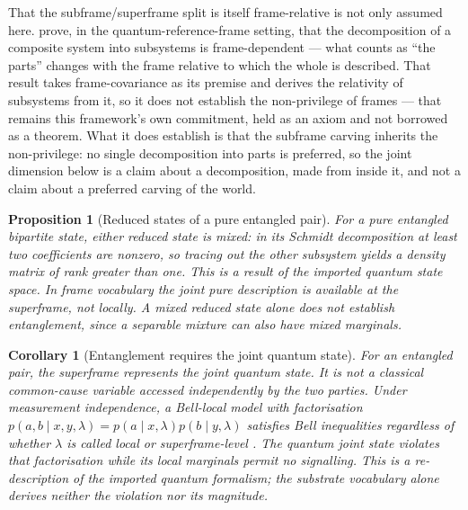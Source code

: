 \documentclass[11pt,a4paper]{article}
\newtheorem{proposition}[definition]{Proposition}
\newtheorem{corollary}[definition]{Corollary}
\theoremstyle{remark}\newtheorem{remark}[definition]{Remark}
\begin{document}
That the subframe/superframe split is itself frame-relative is not only assumed here.
\citet{aliahmad2022} prove, in the quantum-reference-frame setting, that the
decomposition of a composite system into subsystems is frame-dependent --- what counts
as ``the parts'' changes with the frame relative to which the whole is described. That result takes frame-covariance as
its premise and derives the relativity of subsystems from it, so it does not establish the
non-privilege of frames --- that remains this framework's own commitment, held as an axiom and
not borrowed as a theorem. What it does establish is that the subframe carving inherits the
non-privilege: no single decomposition into parts is preferred, so the joint dimension below is
a claim about a decomposition, made from inside it, and not a claim about a preferred
carving of the world.

\begin{proposition}[Reduced states of a pure entangled pair]\label{prop:mixed}
For a pure entangled bipartite state, either reduced state is mixed: in its
Schmidt decomposition at least two coefficients are nonzero, so tracing out
the other subsystem yields a density matrix of rank greater than one. This
is a result of the imported quantum state space. In frame vocabulary the joint
pure description is available at the superframe, not locally. A mixed reduced
state alone does not establish entanglement, since a separable mixture can
also have mixed marginals.
\end{proposition}

\begin{corollary}[Entanglement requires the joint quantum state]\label{cor:nonlocal}
For an entangled pair, the superframe represents the joint quantum state.
It is not a classical common-cause variable accessed independently by the two
parties. Under measurement independence, a Bell-local model with factorisation
$p(a,b\mid x,y,\lambda)=p(a\mid x,\lambda)p(b\mid y,\lambda)$ satisfies
Bell inequalities regardless of whether $\lambda$ is called local or
superframe-level \citep{bell1964}. The quantum joint state violates that
factorisation while its local marginals permit no signalling. This is a
re-description of the imported quantum formalism; the substrate vocabulary
alone derives neither the violation nor its magnitude.
\end{corollary}
\end{document}
